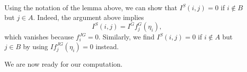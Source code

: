 \begin{remark} \label{rem:special-coefs-vanish}
    Using the notation of the lemma above, we can show that $I^S(i,j)=0$ if $i\notin B$ but $j\in A$. Indeed, the argument above implies
	\[I^S(i,j)=I^Gf_j^G(\eta_i),\]
	which vanishes because $f_i^{JG}=0$. Similarly, we find $I^S(i,j)=0$ if $i\notin A$ but $j\in B$ by using $If_j^{JG}(\eta_i)=0$ instead.
\end{remark}
We are now ready for our computation.
